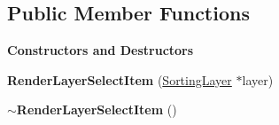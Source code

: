 \subsection*{Public Member Functions}
\begin{Indent}\textbf{ Constructors and Destructors}\par
\begin{DoxyCompactItemize}
\item 
\mbox{\label{classrev_1_1_view_1_1_render_layer_select_item_a9a1cb64baf17cd638bd169ee5f6b283a}} 
{\bfseries Render\+Layer\+Select\+Item} (\mbox{\hyperlink{structrev_1_1_sorting_layer}{Sorting\+Layer}} $\ast$layer)
\item 
\mbox{\label{classrev_1_1_view_1_1_render_layer_select_item_a31bb781c8565aa31caafb63ada6ce089}} 
{\bfseries $\sim$\+Render\+Layer\+Select\+Item} ()
\end{DoxyCompactItemize}
\end{Indent}
